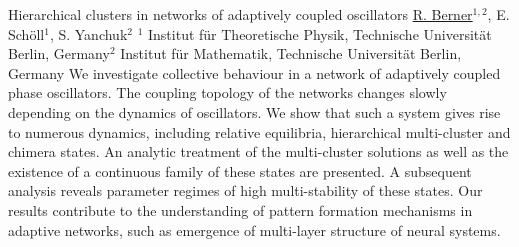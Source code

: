 
    \begin{abstract_online}{Hierarchical clusters in networks of adaptively coupled oscillators}{%
        \underline{R. Berner}$^{1,2}$, E. Schöll$^{1}$, S. Yanchuk$^{2}$}{%
        }{%
        $^1$ Institut für Theoretische Physik, Technische Universität Berlin, Germany\newline{}$^2$ Institut für Mathematik, Technische Universität Berlin, Germany}
    We investigate collective behaviour in a network of adaptively coupled phase oscillators. The  coupling topology of the networks changes slowly depending on the dynamics of oscillators. We  show that such a system gives rise to numerous dynamics, including relative equilibria, hierarchical multi-cluster and chimera states. An analytic treatment of the multi-cluster solutions as well as the existence of a continuous family of these states are presented. A subsequent analysis  reveals parameter regimes of high multi-stability of these states. Our results contribute to the  understanding of pattern formation mechanisms in adaptive networks, such as emergence of  multi-layer structure of neural systems.  
    
    \end{abstract_online}
    